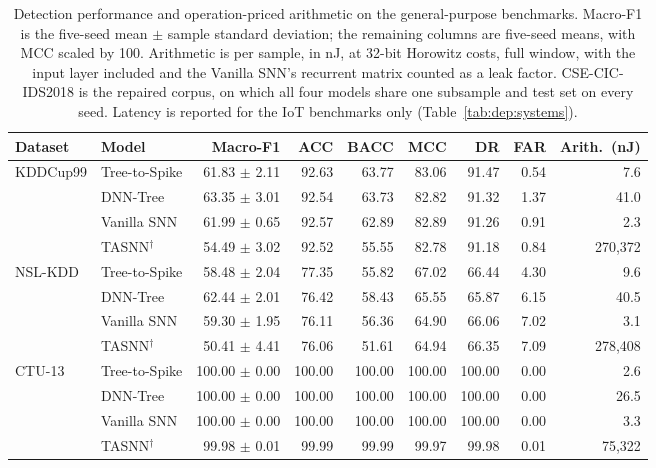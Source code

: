 \begin{table}[!t]
\centering
\caption{Detection performance and operation-priced arithmetic on the general-purpose benchmarks. Macro-F1 is the five-seed mean $\pm$ sample standard deviation; the remaining columns are five-seed means, with MCC scaled by 100. Arithmetic is per sample, in nJ, at 32-bit Horowitz costs, full window, with the input layer included and the Vanilla SNN's recurrent matrix counted as a leak factor. CSE-CIC-IDS2018 is the repaired corpus, on which all four models share one subsample and test set on every seed. Latency is reported for the IoT benchmarks only (Table~\ref{tab:dep:systems}).}
\label{tab:results_general}
\footnotesize
\setlength{\tabcolsep}{4pt}
\begin{tabular}{llrrrrrrr}
\toprule
Dataset & Model & Macro-F1 & ACC & BACC & MCC & DR & FAR & Arith.\ (nJ) \\
\midrule
KDDCup99 & Tree-to-Spike & 61.83 $\pm$ 2.11 & 92.63 & 63.77 & 83.06 & 91.47 & 0.54 & 7.6 \\
 & DNN-Tree & 63.35 $\pm$ 3.01 & 92.54 & 63.73 & 82.82 & 91.32 & 1.37 & 41.0 \\
 & Vanilla SNN & 61.99 $\pm$ 0.65 & 92.57 & 62.89 & 82.89 & 91.26 & 0.91 & 2.3 \\
 & TASNN$^\dagger$ & 54.49 $\pm$ 3.02 & 92.52 & 55.55 & 82.78 & 91.18 & 0.84 & 270{,}372 \\
\midrule
NSL-KDD & Tree-to-Spike & 58.48 $\pm$ 2.04 & 77.35 & 55.82 & 67.02 & 66.44 & 4.30 & 9.6 \\
 & DNN-Tree & 62.44 $\pm$ 2.01 & 76.42 & 58.43 & 65.55 & 65.87 & 6.15 & 40.5 \\
 & Vanilla SNN & 59.30 $\pm$ 1.95 & 76.11 & 56.36 & 64.90 & 66.06 & 7.02 & 3.1 \\
 & TASNN$^\dagger$ & 50.41 $\pm$ 4.41 & 76.06 & 51.61 & 64.94 & 66.35 & 7.09 & 278{,}408 \\
\midrule
CTU-13 & Tree-to-Spike & 100.00 $\pm$ 0.00 & 100.00 & 100.00 & 100.00 & 100.00 & 0.00 & 2.6 \\
 & DNN-Tree & 100.00 $\pm$ 0.00 & 100.00 & 100.00 & 100.00 & 100.00 & 0.00 & 26.5 \\
 & Vanilla SNN & 100.00 $\pm$ 0.00 & 100.00 & 100.00 & 100.00 & 100.00 & 0.00 & 3.3 \\
 & TASNN$^\dagger$ & 99.98 $\pm$ 0.01 & 99.99 & 99.99 & 99.97 & 99.98 & 0.01 & 75{,}322 \\

\end{tabular}
\end{table}

